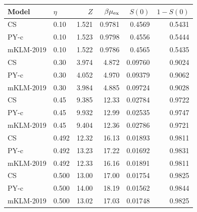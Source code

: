 \begin{tabular}{@{}llrrrr@{}}
\toprule
Model & $\eta$ & $Z$ & $\beta\mu_{\rm ex}$ & $S(0)$ & $1-S(0)$ \\
\midrule
CS & 0.10 & 1.521 & 0.9781 & 0.4569 & 0.5431 \\
PY-c & 0.10 & 1.523 & 0.9798 & 0.4556 & 0.5444 \\
mKLM-2019 & 0.10 & 1.522 & 0.9786 & 0.4565 & 0.5435 \\
CS & 0.30 & 3.974 & 4.872 & 0.09760 & 0.9024 \\
PY-c & 0.30 & 4.052 & 4.970 & 0.09379 & 0.9062 \\
mKLM-2019 & 0.30 & 3.984 & 4.885 & 0.09724 & 0.9028 \\
CS & 0.45 & 9.385 & 12.33 & 0.02784 & 0.9722 \\
PY-c & 0.45 & 9.932 & 12.99 & 0.02535 & 0.9747 \\
mKLM-2019 & 0.45 & 9.404 & 12.36 & 0.02786 & 0.9721 \\
CS & 0.492 & 12.32 & 16.13 & 0.01893 & 0.9811 \\
PY-c & 0.492 & 13.23 & 17.22 & 0.01692 & 0.9831 \\
mKLM-2019 & 0.492 & 12.33 & 16.16 & 0.01891 & 0.9811 \\
CS & 0.500 & 13.00 & 17.00 & 0.01754 & 0.9825 \\
PY-c & 0.500 & 14.00 & 18.19 & 0.01562 & 0.9844 \\
mKLM-2019 & 0.500 & 13.02 & 17.03 & 0.01748 & 0.9825 \\
\bottomrule
\end{tabular}
